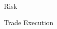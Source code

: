 \documentclass[10pt]{article}
\begin{document}
    \begin{core}{Risk}



    \end{core}

    \begin{core}{Trade Execution}



    \end{core}
\end{document}

